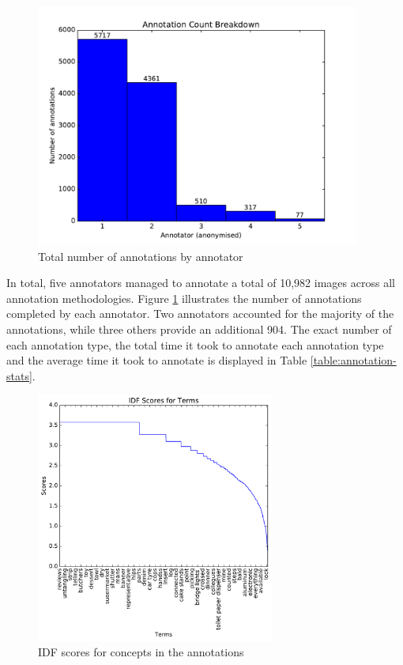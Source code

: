 \begin{figure}[h]
    \centering
    \includegraphics[width=0.95\textwidth]{graphs/annotator-breakdown}
    \caption{Total number of annotations by annotator}
    \label{fig:annotator-breakdown}
\end{figure}

In total, five annotators managed to annotate a total of 10,982 images across all annotation methodologies. Figure \ref{fig:annotator-breakdown} illustrates the number of annotations completed by each annotator. Two annotators accounted for the majority of the annotations, while three others provide an additional 904. The exact number of each annotation type, the total time it took to annotate each annotation type and the average time it took to annotate is displayed in Table \ref{table:annotation-stats}.

\begin{figure}[b]
    \centering
    \includegraphics[width=0.7\textwidth]{graphs/idf-scores}
    \caption{IDF scores for concepts in the annotations}
    \label{fig:idf-scores}
\end{figure}

